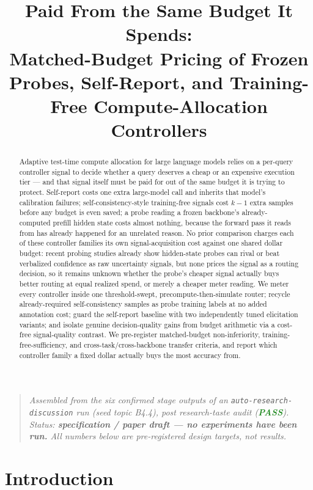 \documentclass[11pt]{article}
\title{\textbf{Paid From the Same Budget It Spends:\\ Matched-Budget Pricing of Frozen Probes, Self-Report, and Training-Free Compute-Allocation Controllers}}
\author{}
\date{}
\begin{document}
\maketitle
\vspace{-2em}

\begin{quote}
\small\textit{Assembled from the six confirmed stage outputs of an \texttt{auto-research-discussion} run (seed topic B4.4), post research-taste audit (\textcolor{ForestGreen}{\textbf{PASS}}). Status: \textbf{specification / paper draft --- no experiments have been run.} All numbers below are pre-registered design targets, not results.}
\end{quote}

\begin{abstract}
Adaptive test-time compute allocation for large language models relies on a per-query controller signal to decide whether a query deserves a cheap or an expensive execution tier --- and that signal itself must be paid for out of the same budget it is trying to protect. Self-report costs one extra large-model call and inherits that model's calibration failures; self-consistency-style training-free signals cost $k-1$ extra samples before any budget is even saved; a probe reading a frozen backbone's already-computed prefill hidden state costs almost nothing, because the forward pass it reads from has already happened for an unrelated reason. No prior comparison charges each of these controller families its own signal-acquisition cost against one shared dollar budget: recent probing studies already show hidden-state probes can rival or beat verbalized confidence as raw uncertainty signals, but none prices the signal as a routing decision, so it remains unknown whether the probe's cheaper signal actually buys better routing at equal realized spend, or merely a cheaper meter reading. We meter every controller inside one threshold-swept, precompute-then-simulate router; recycle already-required self-consistency samples as probe training labels at no added annotation cost; guard the self-report baseline with two independently tuned elicitation variants; and isolate genuine decision-quality gains from budget arithmetic via a cost-free signal-quality contrast. We pre-register matched-budget non-inferiority, training-free-sufficiency, and cross-task/cross-backbone transfer criteria, and report which controller family a fixed dollar actually buys the most accuracy from.
\end{abstract}

\section{Introduction}
\end{document}
